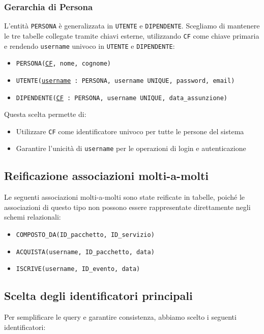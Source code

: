 \documentclass[a4paper,12pt]{report}
\begin{document}
\subsubsection*{Gerarchia di Persona}
L'entità \texttt{PERSONA} è generalizzata in \texttt{UTENTE} e \texttt{DIPENDENTE}. Scegliamo di mantenere le tre tabelle
collegate tramite chiavi esterne, utilizzando \texttt{CF} come chiave primaria e rendendo \texttt{username} univoco in \texttt{UTENTE} e \texttt{DIPENDENTE}:

\begin{itemize}
	\item \texttt{PERSONA(\underline{CF}, nome, cognome)}
	\item \texttt{UTENTE(\underline{username} : PERSONA, username~UNIQUE, password, email)}
	\item \texttt{DIPENDENTE(\underline{CF} : PERSONA, username~UNIQUE, data\_assunzione)}
\end{itemize}

\vspace{\baselineskip}
\noindent Questa scelta permette di:
\begin{itemize}
	\item Utilizzare \texttt{CF} come identificatore univoco per tutte le persone del sistema
	\item Garantire l'unicità di \texttt{username} per le operazioni di login e autenticazione
\end{itemize}

\subsection{Reificazione associazioni molti-a-molti}

Le seguenti associazioni molti-a-molti sono state reificate in tabelle, poiché le associazioni di
questo tipo non possono essere rappresentate direttamente negli schemi relazionali:

\begin{itemize}
	\item \texttt{COMPOSTO\_DA(ID\_pacchetto, ID\_servizio)}
	\item \texttt{ACQUISTA(username, ID\_pacchetto, data)}
	\item \texttt{ISCRIVE(username, ID\_evento, data)}
\end{itemize}

\subsection{Scelta degli identificatori principali}
Per semplificare le query e garantire consistenza, abbiamo scelto i seguenti identificatori:
\end{document}
